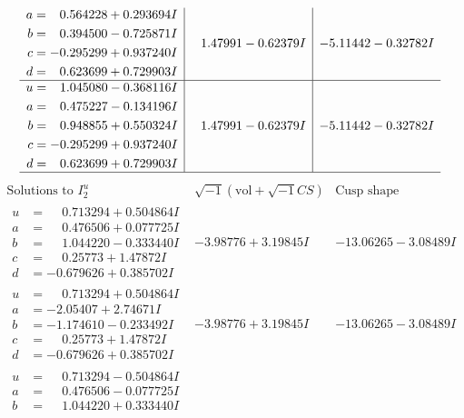 \documentclass[1p]{elsarticle_modified}
\theoremstyle{definition}
\newcommand{\I}{\sqrt{-1}}
\begin{document}
$$\begin{array}{c|c|c}
\begin{aligned}
a &= \phantom{-}0.564228 + 0.293694 I \\
b &= \phantom{-}0.394500 - 0.725871 I \\
c &= -0.295299 + 0.937240 I \\
d &= \phantom{-}0.623699 + 0.729903 I\end{aligned}
 & \phantom{-}1.47991 - 0.62379 I & -5.11442 - 0.32782 I \\ \hline\begin{aligned}
u &= \phantom{-}1.045080 - 0.368116 I \\
a &= \phantom{-}0.475227 - 0.134196 I \\
b &= \phantom{-}0.948855 + 0.550324 I \\
c &= -0.295299 + 0.937240 I \\
d &= \phantom{-}0.623699 + 0.729903 I\end{aligned}
 & \phantom{-}1.47991 - 0.62379 I & -5.11442 - 0.32782 I\\
 \hline 
 \end{array}$$\newpage$$\begin{array}{c|c|c}  
\text{Solutions to }I^u_{2}& \I (\text{vol} + \sqrt{-1}CS) & \text{Cusp shape}\\
 \hline 
\begin{aligned}
u &= \phantom{-}0.713294 + 0.504864 I \\
a &= \phantom{-}0.476506 + 0.077725 I \\
b &= \phantom{-}1.044220 - 0.333440 I \\
c &= \phantom{-}0.25773 + 1.47872 I \\
d &= -0.679626 + 0.385702 I\end{aligned}
 & -3.98776 + 3.19845 I & -13.06265 - 3.08489 I \\ \hline\begin{aligned}
u &= \phantom{-}0.713294 + 0.504864 I \\
a &= -2.05407 + 2.74671 I \\
b &= -1.174610 - 0.233492 I \\
c &= \phantom{-}0.25773 + 1.47872 I \\
d &= -0.679626 + 0.385702 I\end{aligned}
 & -3.98776 + 3.19845 I & -13.06265 - 3.08489 I \\ \hline\begin{aligned}
u &= \phantom{-}0.713294 - 0.504864 I \\
a &= \phantom{-}0.476506 - 0.077725 I \\
b &= \phantom{-}1.044220 + 0.333440 I \\

\end{aligned}
\end{array}$$
\end{document}
